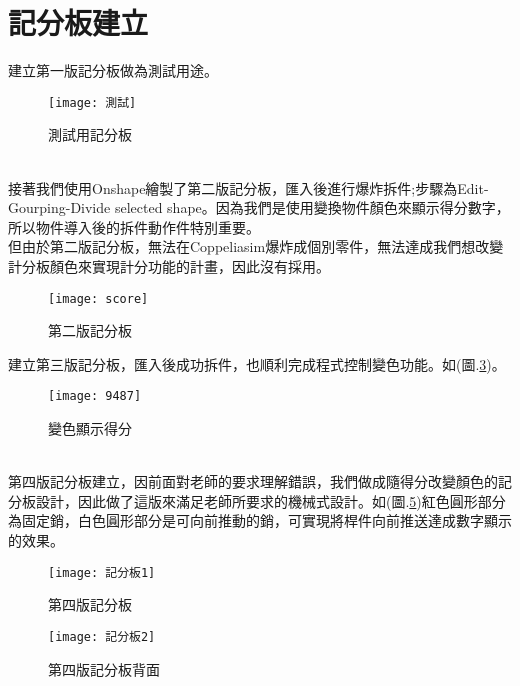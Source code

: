 \section{記分板建立}
建立第一版記分板做為測試用途。\\
\begin{figure}[hbt!]
\begin{center}
\texttt{[image: 測試]}
\caption{\Large 測試用記分板}\label{測試用記分板}
\end{center}
\end{figure} \\
接著我們使用Onshape繪製了第二版記分板，匯入後進行爆炸拆件;步驟為Edit-Gourping-Divide selected shape。因為我們是使用變換物件顏色來顯示得分數字，所以物件導入後的拆件動作件特別重要。\\
但由於第二版記分板，無法在Coppeliasim爆炸成個別零件，無法達成我們想改變計分板顏色來實現計分功能的計畫，因此沒有採用。
\begin{figure}[hbt!]
\begin{center}
\texttt{[image: score]}
\caption{\Large 第二版記分板}\label{第二版記分板}
\end{center}
\end{figure} 
\newpage
建立第三版記分板，匯入後成功拆件，也順利完成程式控制變色功能。如(圖.\ref{變色顯示得分})。\\ 
\begin{figure}[hbt!]
\begin{center}
\texttt{[image: 9487]}
\caption{\Large 變色顯示得分}\label{變色顯示得分}
\end{center}
\end{figure}\\ 
第四版記分板建立，因前面對老師的要求理解錯誤，我們做成隨得分改變顏色的記分板設計，因此做了這版來滿足老師所要求的機械式設計。如(圖.\ref{第四版記分板背面})紅色圓形部分為固定銷，白色圓形部分是可向前推動的銷，可實現將桿件向前推送達成數字顯示的效果。\\
\begin{figure}[hbt!]
\begin{center}
\texttt{[image: 記分板1]}
\caption{\Large 第四版記分板}\label{第四版記分板}
\end{center}
\end{figure}
\begin{figure}[hbt!]
\begin{center}
\newpage
\texttt{[image: 記分板2]}
\caption{\Large 第四版記分板背面}\label{第四版記分板背面}
\end{center}
\end{figure}
